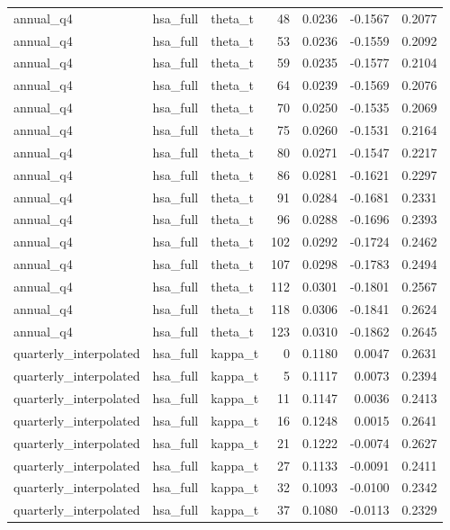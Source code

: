 \begin{tabular}{lllrrrr}
annual\_q4 & hsa\_full & theta\_t & 48 & 0.0236 & -0.1567 & 0.2077 \\
annual\_q4 & hsa\_full & theta\_t & 53 & 0.0236 & -0.1559 & 0.2092 \\
annual\_q4 & hsa\_full & theta\_t & 59 & 0.0235 & -0.1577 & 0.2104 \\
annual\_q4 & hsa\_full & theta\_t & 64 & 0.0239 & -0.1569 & 0.2076 \\
annual\_q4 & hsa\_full & theta\_t & 70 & 0.0250 & -0.1535 & 0.2069 \\
annual\_q4 & hsa\_full & theta\_t & 75 & 0.0260 & -0.1531 & 0.2164 \\
annual\_q4 & hsa\_full & theta\_t & 80 & 0.0271 & -0.1547 & 0.2217 \\
annual\_q4 & hsa\_full & theta\_t & 86 & 0.0281 & -0.1621 & 0.2297 \\
annual\_q4 & hsa\_full & theta\_t & 91 & 0.0284 & -0.1681 & 0.2331 \\
annual\_q4 & hsa\_full & theta\_t & 96 & 0.0288 & -0.1696 & 0.2393 \\
annual\_q4 & hsa\_full & theta\_t & 102 & 0.0292 & -0.1724 & 0.2462 \\
annual\_q4 & hsa\_full & theta\_t & 107 & 0.0298 & -0.1783 & 0.2494 \\
annual\_q4 & hsa\_full & theta\_t & 112 & 0.0301 & -0.1801 & 0.2567 \\
annual\_q4 & hsa\_full & theta\_t & 118 & 0.0306 & -0.1841 & 0.2624 \\
annual\_q4 & hsa\_full & theta\_t & 123 & 0.0310 & -0.1862 & 0.2645 \\
quarterly\_interpolated & hsa\_full & kappa\_t & 0 & 0.1180 & 0.0047 & 0.2631 \\
quarterly\_interpolated & hsa\_full & kappa\_t & 5 & 0.1117 & 0.0073 & 0.2394 \\
quarterly\_interpolated & hsa\_full & kappa\_t & 11 & 0.1147 & 0.0036 & 0.2413 \\
quarterly\_interpolated & hsa\_full & kappa\_t & 16 & 0.1248 & 0.0015 & 0.2641 \\
quarterly\_interpolated & hsa\_full & kappa\_t & 21 & 0.1222 & -0.0074 & 0.2627 \\
quarterly\_interpolated & hsa\_full & kappa\_t & 27 & 0.1133 & -0.0091 & 0.2411 \\
quarterly\_interpolated & hsa\_full & kappa\_t & 32 & 0.1093 & -0.0100 & 0.2342 \\
quarterly\_interpolated & hsa\_full & kappa\_t & 37 & 0.1080 & -0.0113 & 0.2329 \\

\end{tabular}
